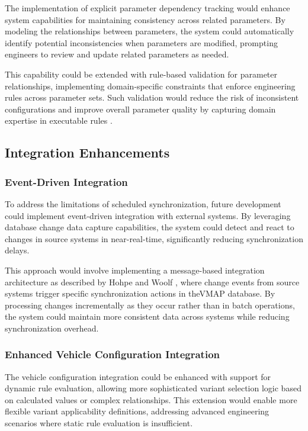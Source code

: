 The implementation of explicit parameter dependency tracking would enhance system capabilities for maintaining consistency across related parameters. By modeling the relationships between parameters, the system could automatically identify potential inconsistencies when parameters are modified, prompting engineers to review and update related parameters as needed.

This capability could be extended with rule-based validation for parameter relationships, implementing domain-specific constraints that enforce engineering rules across parameter sets. Such validation would reduce the risk of inconsistent configurations and improve overall parameter quality by capturing domain expertise in executable rules \cite{pretschner2007software}.

\subsection{Integration Enhancements}
\label{subsec:integration-enhancements}

\subsubsection{Event-Driven Integration}
\label{subsubsec:event-driven-integration}

To address the limitations of scheduled synchronization, future development could implement event-driven integration with external systems. By leveraging database change data capture capabilities, the system could detect and react to changes in source systems in near-real-time, significantly reducing synchronization delays.

This approach would involve implementing a message-based integration architecture as described by Hohpe and Woolf \cite{hohpe2002enterprise}, where change events from source systems trigger specific synchronization actions in the\ac{VMAP} database. By processing changes incrementally as they occur rather than in batch operations, the system could maintain more consistent data across systems while reducing synchronization overhead.

\subsubsection{Enhanced Vehicle Configuration Integration}
\label{subsubsec:vehicle-configuration-integration}

The vehicle configuration integration could be enhanced with support for dynamic rule evaluation, allowing more sophisticated variant selection logic based on calculated values or complex relationships. This extension would enable more flexible variant applicability definitions, addressing advanced engineering scenarios where static rule evaluation is insufficient.


